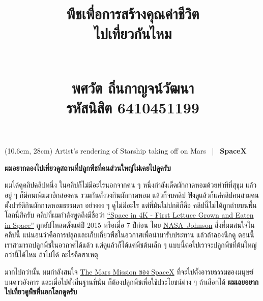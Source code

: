 \documentclass{article}
\title{\flushleft\Large พืชเพื่อการสร้างคุณค่าชีวิต\\
\Huge\textbf{ไปเที่ยวกันไหม}\\
\rule{0em}{1ex}\\
\normalsize พศวัต ถิ่นกาญจน์วัฒนา\\
รหัสนิสิต 6410451199
\vspace{-8ex}}
\author{}
\date{}
\begin{document}
\begin{textblock*}{9cm}(10.6cm, 28cm)
\color{white} Artist's rendering of Starship taking off on Mars~ | ~\textbf{SpaceX}
\end{textblock*}
\maketitle
\sloppy\flushleft

\textbf{ผมอยากลองไปเที่ยวดูสถานที่ปลูกพืชที่คนส่วนใหญ่ไม่เคยไปดูครับ}

\rule{0em}{0.8ex}

ผมได้ดูคลิปคลิปหนึ่ง ในคลิปก็ไม่มีอะไรนอกจากคน ๆ หนึ่งกำลังเด็ดผักกาดหอมด้วยท่าทีที่สุขุม แล้วอยู่ ๆ ก็มีคนเพิ่มมาอีกสองคน
รวมกันตั้งวงกินผักกาดหอม แล้วก็จบคลิป ฟังดูแล้วก็แค่คลิปคนสามคนตั้งปาร์ตีกินผักกาดหอมธรรมดา อย่างงง ๆ ดูไม่มีอะไร
แต่ที่มันไม่ปกติก็คือ คลิปนี้ไม่ได้ถูกถ่ายบนพื้นโลกนี่สิครับ คลิปที่ผมกำลังพูดถึงมีชื่อว่า \href{https://youtu.be/RqtAK-FBtXU}{``Space in 4K - First Lettuce Grown and Eaten in Space''}
ถูกอัปโหลดตั้งแต่ปี 2015 หรือเมื่อ 7 ปีก่อน โดย \mbox{\href{https://www.youtube.com/user/ReelNASA}{NASA Johnson}}
สิ่งที่ผมสนใจในคลิปนี้ แน่นอนว่าคือการปลูกและเก็บเกี่ยวพืชในอวกาศเพื่อนำมารับประทาน แล้วถ้าลองนึกดู ตอนนี้เราสามารถปลูกพืชในอวกาศได้แล้ว
แต่ดูแล้วก็ได้แค่พืชต้นเล็ก ๆ แบบนี้ต่อไปเราจะปลูกพืชที่ต้นใหญ่กว่านี้ได้ไหม ถ้าไม่ได้ อะไรคือสาเหตุ

\rule{0em}{0.8ex}

มากไปกว่านั้น ผมกำลังสนใจ \href{https://www.spacex.com/human-spaceflight/mars/}{The Mars Mission ของ SpaceX} ที่จะไปตั้งอารยธรรมของมนุษย์บนดาวอังคาร
และเมื่อไปตั้งถิ่นฐานที่นั่น ก็ต้องปลูกพืชเพื่อใช้ประโยชน์ต่าง ๆ ถ้าเลือกได้ \textbf{ผมเลยอยากไปเที่ยวดูพืชที่นอกโลกดูครับ}
\end{document}
